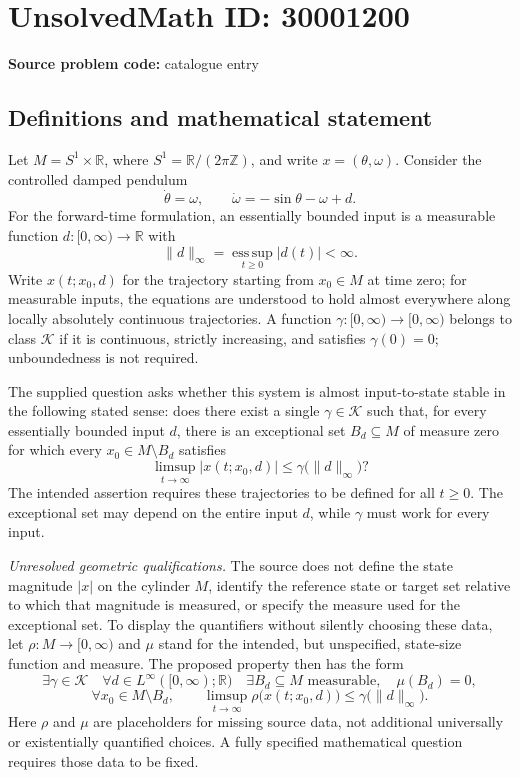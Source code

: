 \documentclass[11pt]{article}
\newcommand{\Z}{\mathbb{Z}}
\newcommand{\R}{\mathbb{R}}
\begin{document}
\section*{UnsolvedMath ID: 30001200}
\textbf{Source problem code:} catalogue entry
\subsection{Definitions and mathematical statement}
Let \(M=S^1\times\R\), where \(S^1=\R/(2\pi\Z)\), and write \(x=(\theta,\omega)\). Consider the controlled damped pendulum
\[
\dot\theta=\omega,\qquad \dot\omega=-\sin\theta-\omega+d.
\]
For the forward-time formulation, an essentially bounded input is a measurable function \(d:[0,\infty)\to\R\) with
\[
\lVert d\rVert_\infty=\operatorname*{ess\,sup}_{t\geq0}|d(t)|<\infty.
\]
Write \(x(t;x_0,d)\) for the trajectory starting from \(x_0\in M\) at time zero; for measurable inputs, the equations are understood to hold almost everywhere along locally absolutely continuous trajectories. A function \(\gamma:[0,\infty)\to[0,\infty)\) belongs to class \(\mathcal K\) if it is continuous, strictly increasing, and satisfies \(\gamma(0)=0\); unboundedness is not required.

The supplied question asks whether this system is almost input-to-state stable in the following stated sense: does there exist a single \(\gamma\in\mathcal K\) such that, for every essentially bounded input \(d\), there is an exceptional set \(B_d\subseteq M\) of measure zero for which every \(x_0\in M\setminus B_d\) satisfies
\[
\limsup_{t\to\infty}|x(t;x_0,d)|\leq\gamma\bigl(\lVert d\rVert_\infty\bigr)?
\]
The intended assertion requires these trajectories to be defined for all \(t\geq0\). The exceptional set may depend on the entire input \(d\), while \(\gamma\) must work for every input.

\textit{Unresolved geometric qualifications.} The source does not define the state magnitude \(|x|\) on the cylinder \(M\), identify the reference state or target set relative to which that magnitude is measured, or specify the measure used for the exceptional set. To display the quantifiers without silently choosing these data, let \(\rho:M\to[0,\infty)\) and \(\mu\) stand for the intended, but unspecified, state-size function and measure. The proposed property then has the form
\[
\exists\gamma\in\mathcal K\quad
\forall d\in L^\infty([0,\infty);\R)\quad
\exists B_d\subseteq M\text{ measurable},\quad \mu(B_d)=0,
\]
\[
\forall x_0\in M\setminus B_d,\qquad
\limsup_{t\to\infty}\rho\bigl(x(t;x_0,d)\bigr)
\leq\gamma\bigl(\lVert d\rVert_\infty\bigr).
\]
Here \(\rho\) and \(\mu\) are placeholders for missing source data, not additional universally or existentially quantified choices. A fully specified mathematical question requires those data to be fixed.
\end{document}
